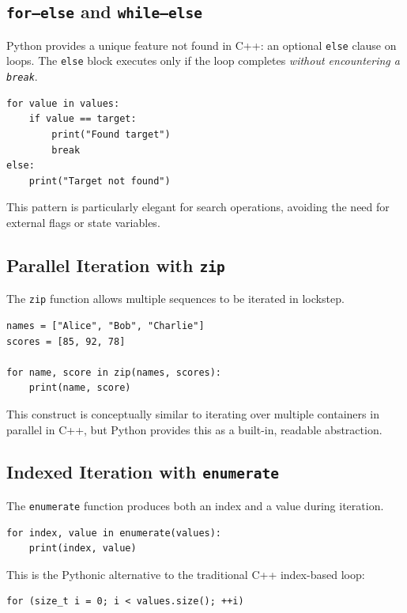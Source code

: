 \subsection{\texttt{for--else} and \texttt{while--else}}

Python provides a unique feature not found in C++: an optional \texttt{else} clause on loops. The \texttt{else} block executes only if the loop completes \emph{without encountering a \texttt{break}}.

\begin{verbatim}
for value in values:
    if value == target:
        print("Found target")
        break
else:
    print("Target not found")
\end{verbatim}

This pattern is particularly elegant for search operations, avoiding the need for external flags or state variables.

\subsection{Parallel Iteration with \texttt{zip}}

The \texttt{zip} function allows multiple sequences to be iterated in lockstep.

\begin{verbatim}
names = ["Alice", "Bob", "Charlie"]
scores = [85, 92, 78]

for name, score in zip(names, scores):
    print(name, score)
\end{verbatim}

This construct is conceptually similar to iterating over multiple containers in parallel in C++, but Python provides this as a built-in, readable abstraction.

\subsection{Indexed Iteration with \texttt{enumerate}}

The \texttt{enumerate} function produces both an index and a value during iteration.

\begin{verbatim}
for index, value in enumerate(values):
    print(index, value)
\end{verbatim}

This is the Pythonic alternative to the traditional C++ index-based loop:

\begin{verbatim}
for (size_t i = 0; i < values.size(); ++i)
\end{verbatim}

